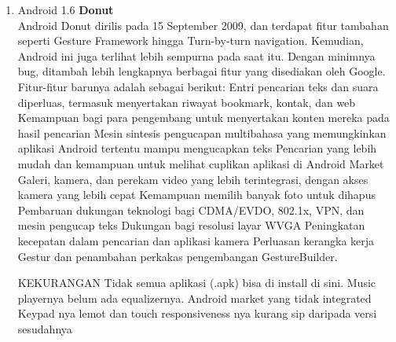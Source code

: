 \begin{enumerate}
\item Android 1.6 \textbf{Donut}\\
Android Donut dirilis pada 15 September 2009, dan terdapat fitur tambahan seperti Gesture Framework hingga Turn-by-turn navigation. Kemudian, Android ini juga terlihat lebih sempurna pada saat itu. Dengan minimnya bug, ditambah lebih lengkapnya berbagai fitur yang disediakan oleh Google. Fitur-fitur barunya adalah sebagai berikut:
Entri pencarian teks dan suara diperluas, termasuk menyertakan riwayat bookmark, kontak, dan web
Kemampuan bagi para pengembang untuk menyertakan konten mereka pada hasil pencarian
Mesin sintesis pengucapan multibahasa yang memungkinkan aplikasi Android tertentu mampu mengucapkan teks
Pencarian yang lebih mudah dan kemampuan untuk melihat cuplikan aplikasi di Android Market
Galeri, kamera, dan perekam video yang lebih terintegrasi, dengan akses kamera yang lebih cepat
Kemampuan memilih banyak foto untuk dihapus
Pembaruan dukungan teknologi bagi CDMA/EVDO, 802.1x, VPN, dan mesin pengucap teks
Dukungan bagi resolusi layar WVGA
Peningkatan kecepatan dalam pencarian dan aplikasi kamera
Perluasan kerangka kerja Gestur dan penambahan perkakas pengembangan GestureBuilder.

KEKURANGAN
Tidak semua aplikasi (.apk) bisa di install di sini.
Music playernya belum ada equalizernya.
Android market yang tidak integrated
Keypad nya lemot dan touch responsiveness nya kurang sip daripada versi sesudahnya




\end{enumerate}
